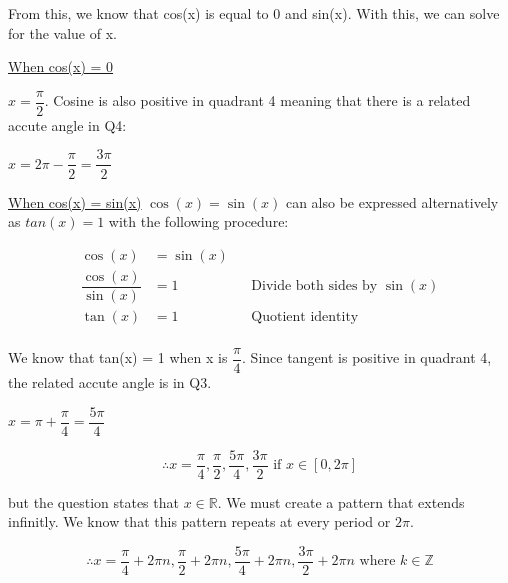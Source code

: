 \documentclass[12pt]{book}
\begin{document}
\begin{enumerate}
From this, we know that cos(x) is equal to 0 and sin(x). With this, we can solve for the value of x.

\vspace{0.3cm}
\underline{When cos(x) = 0}

\vspace{0.1cm}
$x = \boxed{\dfrac{\pi}{2}}$. Cosine is also positive in quadrant 4 meaning that there is a 
related accute angle in Q4:

$x = 2\pi - \dfrac{\pi}{2} = \boxed{\dfrac{3\pi}{2}}$

\vspace{0.3cm}
\underline{When cos(x) = sin(x)}
$\cos(x) = \sin(x)$ can also be expressed alternatively as $tan(x) = 1$ with the following procedure:

\begin{align*}
    \cos(x) &= \sin(x) \\
    \dfrac{\cos(x)}{\sin(x)} &= 1 && \text{Divide both sides by } \sin(x) \\
    \tan(x) &= 1 && \text{Quotient identity} \\ 
\end{align*}

We know that tan(x) = 1 when x is $\boxed{\dfrac{\pi}{4}}$. Since tangent is positive in 
quadrant 4, the related accute angle is in Q3. 

$x = \pi + \dfrac{\pi}{4} = \boxed{\dfrac{5\pi}{4}}$

\newpage

$$\therefore x = \dfrac{\pi}{4}, \dfrac{\pi}{2}, \dfrac{5\pi}{4} , \dfrac{3\pi}{2} \text{ if } x \in [0, 2\pi]$$

but the question states that $x \in \mathbb{R}$. We must create a pattern that extends 
infinitly. We know that this pattern repeats at every period or $2\pi$.

$$\boxed{\therefore x = \dfrac{\pi}{4} + 2\pi n, \dfrac{\pi}{2} + 2\pi n, \dfrac{5\pi}{4} + 2\pi n , \dfrac{3\pi}{2} + 2\pi n \text{ where } k \in \mathbb{Z}}$$

\vspace{0.1cm}


\newpage


\end{enumerate}
\end{document}
